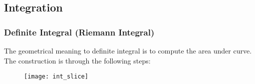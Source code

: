 \documentclass[class=article, crop=false, 12pt]{standalone}
\begin{document}
\subsection{Integration}

\subsubsection{Definite Integral (Riemann Integral)}

The geometrical meaning to definite integral is to compute the area under curve. 
The construction is through the following steps:

\begin{figure}[h]
    \centering
    \texttt{[image: int\_slice]}
\end{figure}
\end{document}
